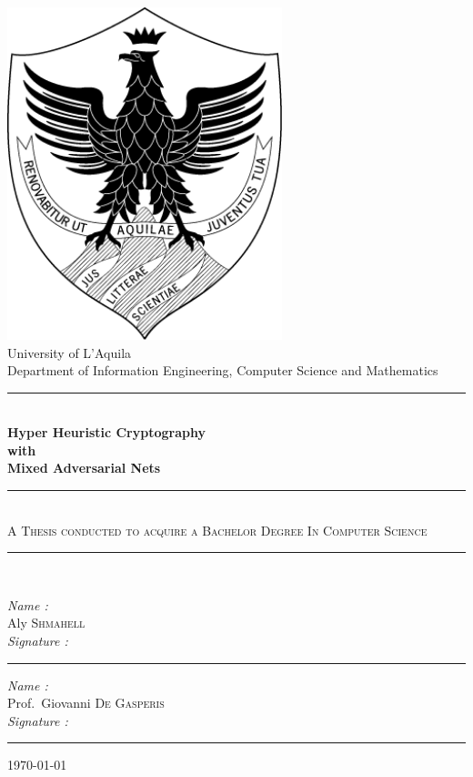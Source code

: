 \documentclass[a4paper, 12pt]{report}
\newcommand\tab[1][1cm]{\hspace*{#1}}
\begin{document}
\begin{titlepage}
	\begin{center}
		\includegraphics[width=0.6\textwidth]{UnivAQ-logo}\\[1cm]
		{\LARGE University of L'Aquila}\\[0.5cm]
		{\large Department of Information Engineering, Computer Science and Mathematics}\\[0.5cm]
		\rule{\linewidth}{0.5mm} \\[0.4cm]
		{\huge \bfseries Hyper Heuristic Cryptography\\
			with\\
			Mixed Adversarial Nets \\[0.4cm] }
		\rule{\linewidth}{0.5mm} \\[0.1cm]
		\noindent
		{\large  \textsc{A Thesis conducted to acquire a Bachelor Degree In Computer Science}
			\vspace{-0.04cm} \\[0.01cm] }
		\rule{\linewidth}{0.5mm} \\[0.1cm]
		\noindent
			\begin{tcbraster}[raster columns=2,raster rows=1,
				enhanced,size=small,fit algorithm=hybrid* ]
					\begin{tcolorbox}[
						colback=white,
						sharp corners = northwest,
						title={Author}
						]
							\large
							\emph{Name :} \\[0.2cm]
							\tab Aly \textsc{Shmahell}\\[0.6cm]
							\emph{Signature :}\\[0.6cm]
							\rule{\linewidth}{0.5mm}
					\end{tcolorbox}
					\begin{tcolorbox}[
						colback=white,
						sharp corners = northwest,
						title = {Supervisor}
						]
							\large
							\emph{Name :} \\[0.2cm]
							\tab Prof.~Giovanni \textsc{De Gasperis}\\[0.6cm]
							\emph{Signature :}\\[0.6cm]
							\rule{\linewidth}{0.5mm}
					\end{tcolorbox}
			\end{tcbraster}
			\vspace{0.1cm}
		\today
	\end{center}
\end{titlepage}
\end{document}
